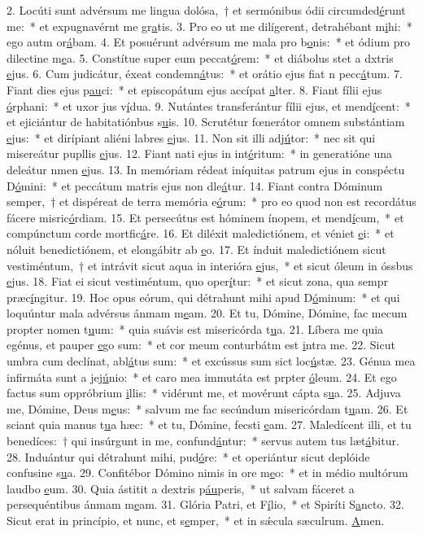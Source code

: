 2. Locúti sunt advérsum me lingua dolósa,~† et sermónibus ódii circumded\uline{é}runt me:~* et expugnavérnt me gr\uline{a}tis.
3. Pro eo ut me dilígerent, detrahébant m\uline{i}hi:~* ego autm or\uline{á}bam.
4. Et posuérunt advérsum me mala pro b\uline{o}nis:~* et ódium pro dilectine m\uline{e}a.
5. Constítue super eum peccat\uline{ó}rem:~* et diábolus stet a dxtris \uline{e}jus.
6. Cum judicátur, éxeat condemn\uline{á}tus:~* et orátio ejus fiat n pecc\uline{á}tum.
7. Fiant dies ejus p\uline{au}ci:~* et episcopátum ejus accípat \uline{a}lter.
8. Fiant fílii ejus \uline{ó}rphani:~* et uxor jus v\uline{í}dua.
9. Nutántes transferántur fílii ejus, et mend\uline{í}cent:~* et ejiciántur de habitatiónbus s\uline{u}is.
10. Scrutétur fœnerátor omnem substántiam \uline{e}jus:~* et dirípiant aliéni labres \uline{e}jus.
11. Non sit illi adj\uline{ú}tor:~* nec sit qui misereátur pupllis \uline{e}jus.
12. Fiant nati ejus in int\uline{é}ritum:~* in generatióne una deleátur nmen \uline{e}jus.
13. In memóriam rédeat iníquitas patrum ejus in conspéctu D\uline{ó}mini:~* et peccátum matris ejus non dle\uline{á}tur.
14. Fiant contra Dóminum semper,~† et dispéreat de terra memória e\uline{ó}rum:~* pro eo quod non est recordátus fácere misric\uline{ó}rdiam.
15. Et persecútus est hóminem ínopem, et mend\uline{í}cum,~* et compúnctum corde mortfic\uline{á}re.
16. Et diléxit maledictiónem, et véniet \uline{e}i:~* et nóluit benedictiónem, et elongábitr ab \uline{e}o.
17. Et índuit maledictiónem sicut vestiméntum,~† et intrávit sicut aqua in interióra \uline{e}jus,~* et sicut óleum in óssbus \uline{e}jus.
18. Fiat ei sicut vestiméntum, quo oper\uline{í}tur:~* et sicut zona, qua sempr præc\uline{í}ngitur.
19. Hoc opus eórum, qui détrahunt mihi apud D\uline{ó}minum:~* et qui loquúntur mala advérsus ánmam m\uline{e}am.
20. Et tu, Dómine, Dómine, fac mecum propter nomen t\uline{u}um:~* quia suávis est misericórda t\uline{u}a.
21. Líbera me quia egénus, et pauper \uline{e}go sum:~* et cor meum conturbátm est \uline{i}ntra me.
22. Sicut umbra cum declínat, abl\uline{á}tus sum:~* et excússus sum sict loc\uline{ú}stæ.
23. Génua mea infirmáta sunt a jej\uline{ú}nio:~* et caro mea immutáta est prpter \uline{ó}leum.
24. Et ego factus sum oppróbrium \uline{i}llis:~* vidérunt me, et movérunt cápta s\uline{u}a.
25. Adjuva me, Dómine, Deus m\uline{e}us:~* salvum me fac secúndum misericórdam t\uline{u}am.
26. Et sciant quia manus t\uline{u}a hæc:~* et tu, Dómine, fecsti \uline{e}am.
27. Maledícent illi, et tu benedíces:~† qui insúrgunt in me, confund\uline{á}ntur:~* servus autem tus læt\uline{á}bitur.
28. Induántur qui détrahunt mihi, pud\uline{ó}re:~* et operiántur sicut deplóide confusine s\uline{u}a.
29. Confitébor Dómino nimis in ore m\uline{e}o:~* et in médio multórum laudbo \uline{e}um.
30. Quia ástitit a dextris p\uline{áu}peris,~* ut salvam fáceret a persequéntibus ánmam m\uline{e}am.
31. Glória Patri, et F\uline{í}lio,~* et Spiríti S\uline{a}ncto.
32. Sicut erat in princípio, et nunc, et s\uline{e}mper,~* et in sǽcula sæculrum. \uline{A}men.
